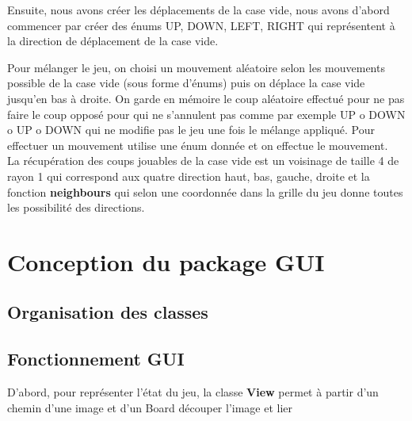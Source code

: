 \documentclass[a4paper,12pt]{article} %
\begin{document}
Ensuite, nous avons créer les déplacements de la case vide, nous avons d'abord commencer par créer des énums UP, DOWN, LEFT, RIGHT qui représentent à la direction de déplacement de la case vide.

Pour mélanger le jeu, on choisi un mouvement aléatoire selon les mouvements possible de la case vide (sous forme d'énums) puis on déplace la case vide jusqu'en bas à droite. On garde en mémoire le coup aléatoire effectué pour ne pas faire le coup opposé pour qui ne s'annulent pas comme par exemple UP o DOWN o UP o DOWN qui ne modifie pas le jeu une fois le mélange appliqué. Pour effectuer un mouvement utilise une énum donnée et on effectue le mouvement.\\

La récupération des coups jouables de la case vide est un voisinage de taille 4 de rayon 1 qui correspond aux quatre direction haut, bas, gauche, droite et la fonction \textbf{neighbours} qui selon une coordonnée dans la grille du jeu donne toutes les possibilité des directions.

\section{Conception du package GUI}

\subsection{Organisation des classes}


\subsection{Fonctionnement GUI}

D'abord, pour représenter l'état du jeu, la classe \textbf{View} permet à partir d'un chemin d'une image et d'un Board découper l'image et lier
\end{document}
